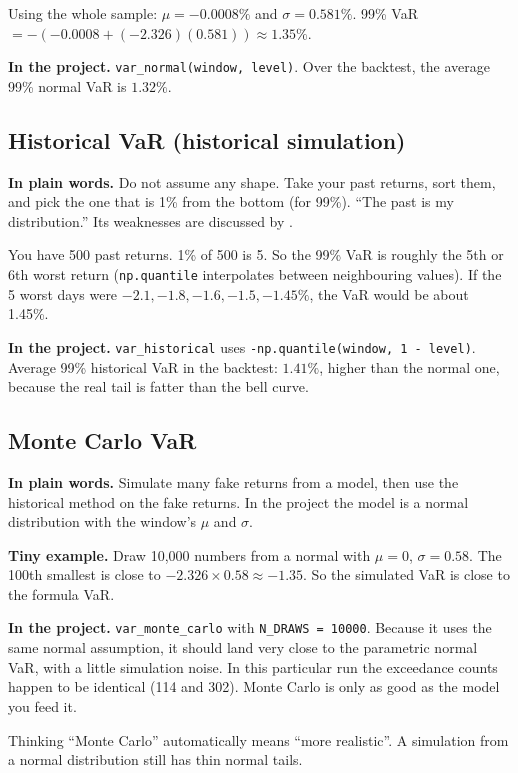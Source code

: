 \documentclass[11pt,a4paper]{article}
\newcommand{\term}[1]{\subsection{#1}}
\newcommand{\plain}{\textbf{In plain words.} }
\newcommand{\inproj}{\textbf{In the project.} }
\newcommand{\tinyex}{\textbf{Tiny example.} }
\newcommand{\code}[1]{\texttt{#1}}
\begin{document}
\begin{example}
Using the whole sample: $\mu = -0.0008\%$ and $\sigma = 0.581\%$.
99\% VaR $= -(-0.0008 + (-2.326)(0.581)) \approx 1.35\%$.
\end{example}

\inproj \code{var\_normal(window, level)}. Over the backtest, the average
99\% normal VaR is $1.32\%$.

\term{Historical VaR (historical simulation)}\label{g:varhist}
\plain Do not assume any shape. Take your past returns, sort them, and pick
the one that is 1\% from the bottom (for 99\%). ``The past is my
distribution.'' Its weaknesses are discussed by \citet{pritsker2006}.

\begin{example}
You have 500 past returns. 1\% of 500 is 5. So the 99\% VaR is roughly the
5th or 6th worst return (\code{np.quantile} interpolates between
neighbouring values). If the 5 worst days were $-2.1, -1.8, -1.6, -1.5,
-1.45\%$, the VaR would be about 1.45\%.
\end{example}

\inproj \code{var\_historical} uses \code{-np.quantile(window, 1 - level)}.
Average 99\% historical VaR in the backtest: $1.41\%$, higher than the
normal one, because the real tail is fatter than the bell curve.

\term{Monte Carlo VaR}\label{g:varmc}
\plain Simulate many fake returns from a model, then use the historical
method on the fake returns. In the project the model is a normal
distribution with the window's $\mu$ and $\sigma$.

\tinyex Draw 10{,}000 numbers from a normal with $\mu=0$, $\sigma=0.58$. The
100th smallest is close to $-2.326 \times 0.58 \approx -1.35$. So the
simulated VaR is close to the formula VaR.

\inproj \code{var\_monte\_carlo} with \code{N\_DRAWS = 10000}. Because it
uses the same normal assumption, it should land very close to the
parametric normal VaR, with a little simulation noise. In this particular
run the exceedance counts happen to be identical (114 and 302). Monte Carlo is only as good as the model you feed it.

\begin{mistake}
Thinking ``Monte Carlo'' automatically means ``more realistic''. A
simulation from a normal distribution still has thin normal tails.
\end{mistake}

\end{document}
